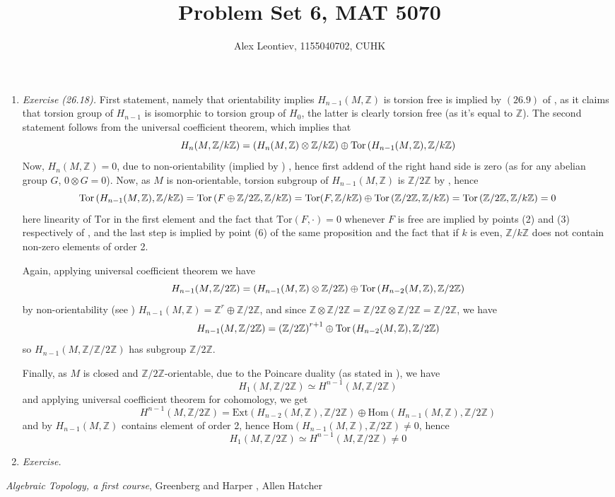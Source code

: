 \documentclass[8pt]{article} %
\title{Problem Set 6, MAT 5070}
\author{Alex Leontiev, 1155040702, CUHK}
\newcommand{\Z}{\mathbb{Z}}
\newcommand{\kZ}{\mathbb{Z}/k\mathbb{Z}}
\newcommand{\tZ}{\mathbb{Z}/2\mathbb{Z}}
\newcommand{\Tor}{\mbox{Tor}}
\newcommand{\Hom}{\mbox{Hom}}
\newcommand{\Ext}{\mbox{Ext}}
\begin{document}
\maketitle
\begin{enumerate}[label=\bfseries \arabic*.]
	\item{{\it Exercise (26.18). }First statement, namely that orientability implies $H_{n-1}(M,\mathbb{Z})$ is torsion free is implied
		by $(26.9)$ of \cite{gh}, as it claims that torsion group of $H_{n-1}$ is isomorphic to torsion group of $H_0$, the latter
		is clearly torsion free (as it's equal to $\mathbb{Z}$). The second statement follows from the universal coefficient
		theorem, which implies that
		\[H_n(M,\mathbb{Z}/k\mathbb{Z})=\mybra{H_n(M,\mathbb{Z})\otimes\kZ}\oplus\Tor\mybra{H_{n-1}(M,\Z),\kZ}\]
		Now, $H_n(M,\mathbb{Z})=0$, due to non-orientability (implied by \cite[Theorem 3.26(b)]{hatcher})
		, hence first addend of the right hand side
		is zero (as for any abelian group $G$, $0\otimes G=0$). Now, as $M$ is non-orientable, torsion subgroup of $H_{n-1}(M,\Z)$
		is $\mathbb{Z}/2\mathbb{Z}$ by \cite[Corollary 3.28]{hatcher}, hence 
		\[\Tor\mybra{H_{n-1}(M,\Z),\kZ}=\Tor\mybra{F\oplus\mathbb{Z}/2\mathbb{Z},\kZ}=\Tor(F,\kZ)\oplus\Tor\mybra{\mathbb{Z}/2\mathbb{Z}
		,\kZ}=\Tor\mybra{\mathbb{Z}/2\mathbb{Z},\kZ}=0\]
		here linearity of $\Tor$ in the first element and the fact that $\Tor(F,\cdot)=0$ whenever $F$ is free are implied by points
		(2) and (3) respectively of \cite[Proposition 3A.5]{hatcher}, and the last step is implied by point (6) of the same proposition
		and the fact that if $k$ is even, $\kZ$ does not contain non-zero elements of order 2.

		Again, applying universal coefficient theorem we have
		\[H_{n-1}(M,\mathbb{Z}/2\mathbb{Z})=\mybra{H_{n-1}(M,\mathbb{Z})\otimes\tZ}\oplus\Tor\mybra{H_{n-2}(M,\Z),\tZ}\]
		by non-orientability (see \cite[Corollary 3.28]{hatcher}) $H_{n-1}(M,\Z)=\Z^r\oplus\tZ$, and since $\Z\otimes\tZ=\tZ\otimes\tZ=
		\tZ$, we have
		\[H_{n-1}(M,\mathbb{Z}/2\mathbb{Z})=\mybra{\tZ}^{r+1}\oplus\Tor\mybra{H_{n-2}(M,\Z),\tZ}\]
		so $H_{n-1}(M,\Z/\tZ)$ has subgroup $\tZ$.

		Finally, as $M$ is closed and $\tZ$-orientable, due to the Poincare duality (as stated in \cite[Theorem 3.30]{hatcher}), we have 
		\[H_1(M,\tZ)\simeq H^{n-1}(M,\tZ)\]
		and applying universal coefficient theorem for cohomology, we get
		\[H^{n-1}(M,\tZ)=\Ext(H_{n-2}(M,\Z),\tZ)\oplus\Hom(H_{n-1}(M,\Z),\tZ)\]
		and by \cite[Corollary 3.28]{hatcher} $H_{n-1}(M,\Z)$ contains element of order 2, hence $\Hom(H_{n-1}(M,\Z),\tZ)\neq0$, hence
		\[H_1(M,\tZ)\simeq H^{n-1}(M,\tZ)\neq0\]
		}
	\item{{\it Exercise. }
		}
\end{enumerate}
\begin{thebibliography}{9}
	 {\em Algebraic Topology, a first course}, Greenberg and Harper
	, Allen Hatcher
\end{thebibliography}
\end{document}
